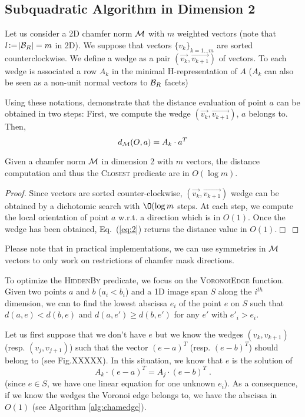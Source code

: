 \documentclass{llncs}
\begin{document}
\subsection{Subquadratic Algorithm in Dimension 2}
\label{sec:subq-algor-dimens}

Let us consider a 2D chamfer norm $\mathcal{M}$ with $m$ weighted vectors (note
that $l\!\mathrel{\mathop:}=\!|\mathcal{B}_R| = m$ in 2D). We suppose that vectors
$\{v_k\}_{k=1\ldots m}$ are sorted counterclockwise. We define a wedge
as a pair $(\vec{v_k},\vec{v_{k+1}})$ of vectors. To each wedge is
associated a row $A_k$ in the minimal H-representation of $A$ ($A_k$
can also be seen as a non-unit normal vectors to $\mathcal{B}_R$
facets\cite{DBLP:journals/pr/NormandE09})

Using these notations, \cite{Thiel_hdr,Strand2008} demonstrate that
the distance evaluation of point $a$ can be obtained in two steps:
First, we compute the wedge $(\vec{v_k},\vec{v_{k+1}})$, $a$ belongs
to. Then,
\begin{equation}
\label{eq:2}
  d_{\mathcal{M}}(O,a) = A_k\cdot a^T
\end{equation}

\begin{lemma}
\label{lem:log}
  Given a chamfer norm $\mathcal{M}$ in dimension 2 with $m$ vectors, the distance computation
  and thus the \textsc{Closest} predicate are in $O(\log{m})$.
\end{lemma}
\begin{proof}
  Since vectors are sorted counter-clockwise,
  $(\vec{v_k},\vec{v_{k+1}})$ wedge can be obtained by a dichotomic
  search with $\O(\log{m}$ steps. At each step, we compute the local
  orientation of point $a$ w.r.t. a direction which is in $O(1)$. Once
  the wedge has been obtained, Eq.~(\ref{eq:2}) returns the distance
  value in $O(1)$.$\Box$
\end{proof}

Please note that in practical implementations, we can use symmetries
in $\mathcal{M}$ vectors to only work on restrictions of chamfer mask
directions.

To optimize the \textsc{HiddenBy} predicate, we focus on the
\textsc{VoronoiEdge} function. Given two points $a$ and $b$
($a_i<b_i$) and a 1D image span $S$ along the $i^{th}$ dimension, we
can to find the lowest abscissa $e_i$ of the point $e$ on $S$ such
that $d(a,e) < d(b,e)$ and $d(a,e')\geq d(b, e')$ for any $e'$ with
$e'_i>e_i$.

Let us first suppose that we don't have $e$ but we know the wedges
$(v_{k},v_{k+1})$ (resp. $(v_j,v_{j+1})$) such that the vector
$(e-a)^T$ (resp. $(e-b)^T$) should belong to (see Fig.XXXXX). In this
situation, we know that $e$ is the solution of
\begin{equation}
\label{eq:3}
  A_k\cdot  (e-a)^T = A_j\cdot (e -b)^T\;.
\end{equation}
(since $e\in S$, we have one linear equation for one unknown
$e_i$). As a consequence, if we know the wedges the Voronoi edge
belongs to, we have the abscissa in $O(1)$ (see Algorithm \ref{alg:chamedge}).
\end{document}
